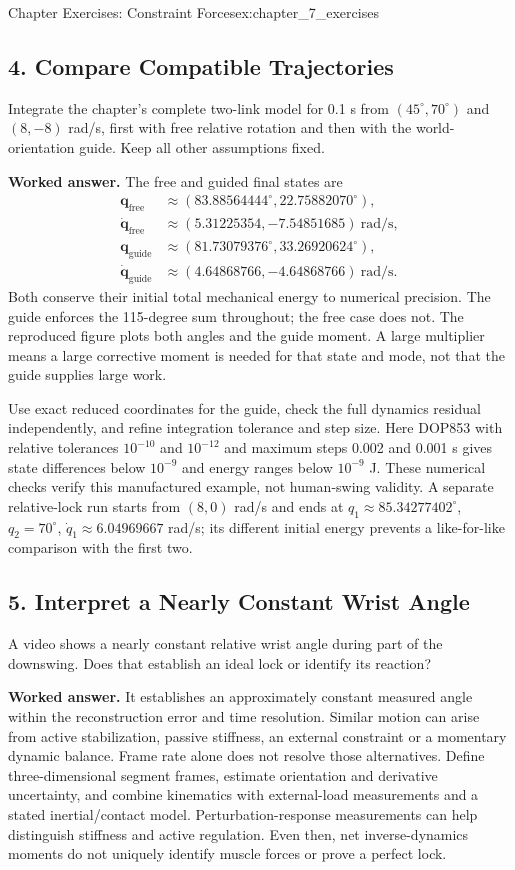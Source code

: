 \begin{exercises}{Chapter Exercises: Constraint Forces}{ex:chapter_7_exercises}
\subsection*{4. Compare Compatible Trajectories}
Integrate the chapter's complete two-link model for 0.1 s from $(45^\circ,70^\circ)$ and $(8,-8)$ rad/s, first with free relative rotation and then with the world-orientation guide. Keep all other assumptions fixed.

\textbf{Worked answer.} The free and guided final states are
\[
\begin{aligned}
\bm q_{\mathrm{free}}&\approx(83.88564444^\circ,22.75882070^\circ),\\
\dot{\bm q}_{\mathrm{free}}&\approx(5.31225354,-7.54851685)\ \mathrm{rad/s},\\
\bm q_{\mathrm{guide}}&\approx(81.73079376^\circ,33.26920624^\circ),\\
\dot{\bm q}_{\mathrm{guide}}&\approx(4.64868766,-4.64868766)\ \mathrm{rad/s}.
\end{aligned}
\]
Both conserve their initial total mechanical energy to numerical precision. The guide enforces the 115-degree sum throughout; the free case does not. The reproduced figure plots both angles and the guide moment. A large multiplier means a large corrective moment is needed for that state and mode, not that the guide supplies large work.

Use exact reduced coordinates for the guide, check the full dynamics residual independently, and refine integration tolerance and step size. Here DOP853 with relative tolerances $10^{-10}$ and $10^{-12}$ and maximum steps 0.002 and 0.001 s gives state differences below $10^{-9}$ and energy ranges below $10^{-9}$ J. These numerical checks verify this manufactured example, not human-swing validity. A separate relative-lock run starts from $(8,0)$ rad/s and ends at $q_1\approx85.34277402^\circ$, $q_2=70^\circ$, $\dot q_1\approx6.04969667$ rad/s; its different initial energy prevents a like-for-like comparison with the first two.

\subsection*{5. Interpret a Nearly Constant Wrist Angle}
A video shows a nearly constant relative wrist angle during part of the downswing. Does that establish an ideal lock or identify its reaction?

\textbf{Worked answer.} It establishes an approximately constant measured angle within the reconstruction error and time resolution. Similar motion can arise from active stabilization, passive stiffness, an external constraint or a momentary dynamic balance. Frame rate alone does not resolve those alternatives. Define three-dimensional segment frames, estimate orientation and derivative uncertainty, and combine kinematics with external-load measurements and a stated inertial/contact model. Perturbation-response measurements can help distinguish stiffness and active regulation. Even then, net inverse-dynamics moments do not uniquely identify muscle forces or prove a perfect lock.


\end{exercises}
